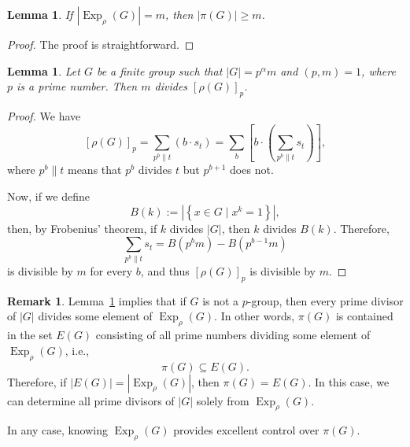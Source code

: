 \documentclass[12pt]{amsart}
\newtheorem{lemma}[theorem]{Lemma}
\theoremstyle{definition}
\newtheorem{remark}[theorem]{Remark}
\begin{document}
	\begin{lemma}\label{111}
		If $|{\operatorname{Exp}}_{\rho}(G)|=m$, then $|\pi(G)|\geqslant m$.
	\end{lemma}
\begin{proof}
	The proof is straightforward.
\end{proof}
	\begin{lemma} \label{bhamed}  
		Let $G$ be a finite group such that $|G|=p^{\alpha}m$ and  $(p,m)=1$, where $p$ is a  prime  number. Then
		$m $ divides $ [\rho(G)]_p$.
	\end{lemma}
\begin{proof}
	We have
	\[
	[\rho(G)]_p = \sum_{p^b \parallel t} \left(b \cdot s_t\right) = \sum_b \left[b \cdot \left(\sum_{p^b \parallel t} s_t\right)\right],
	\]
	where \textbf{$p^b \parallel t$} means that $p^b$ divides $t$ but $p^{b+1}$ does not.
	
	Now, if we define
	\[
	B(k) := \left|\left\{x \in G \mid x^k = 1\right\}\right|,
	\]
	then, by Frobenius' theorem, if $k$ divides $|G|$, then $k$ divides $B(k)$. Therefore,
	\[
	\sum_{p^b \parallel t} s_t = B\left(p^b m\right) - B\left(p^{b-1} m\right)
	\]
	is divisible by $m$ for every $b$, and thus $[\rho(G)]_p$ is divisible by $m$.
\end{proof}
\begin{remark} \label{rem}
Lemma~\ref{bhamed} implies that if $G$ is not a $p$-group, then every prime divisor of $|G|$ divides some element of $\operatorname{Exp}_\rho(G)$. In other words, $\pi(G)$ is contained in the set $E(G)$ consisting of all prime numbers dividing some element of $\operatorname{Exp}_\rho(G)$, i.e.,
\[
\pi(G) \subseteq E(G).
\]
Therefore, if $|E(G)| = \left|\operatorname{Exp}_\rho(G)\right|$, then $\pi(G) = E(G)$. In this case, we can determine all prime divisors of $|G|$ solely from $\operatorname{Exp}_\rho(G)$.

In any case, knowing $\operatorname{Exp}_\rho(G)$ provides excellent control over $\pi(G)$.
\end{remark}
\end{document}

